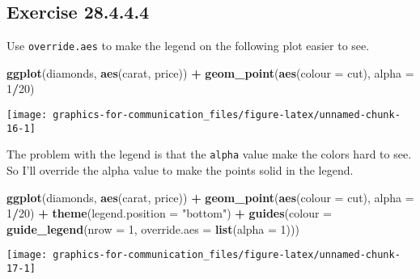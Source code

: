 \documentclass[]{book}
\newenvironment{Shaded}{\begin{snugshade}}{\end{snugshade}}
\newcommand{\DataTypeTok}[1]{\textcolor[rgb]{0.13,0.29,0.53}{#1}}
\newcommand{\DecValTok}[1]{\textcolor[rgb]{0.00,0.00,0.81}{#1}}
\newcommand{\KeywordTok}[1]{\textcolor[rgb]{0.13,0.29,0.53}{\textbf{#1}}}
\newcommand{\NormalTok}[1]{#1}
\newcommand{\OperatorTok}[1]{\textcolor[rgb]{0.81,0.36,0.00}{\textbf{#1}}}
\newcommand{\StringTok}[1]{\textcolor[rgb]{0.31,0.60,0.02}{#1}}
\theoremstyle{plain}
\theoremstyle{remark}
\begin{document}
\hypertarget{exercise-28.4.4.4}{%
\subsection*{\texorpdfstring{Exercise
{28.4.4.4}}{Exercise 28.4.4.4}}\label{exercise-28.4.4.4}}

Use \texttt{override.aes} to make the legend on the following plot
easier to see.

\begin{Shaded}
\begin{Highlighting}[]
\KeywordTok{ggplot}\NormalTok{(diamonds, }\KeywordTok{aes}\NormalTok{(carat, price)) }\OperatorTok{+}
\StringTok{  }\KeywordTok{geom_point}\NormalTok{(}\KeywordTok{aes}\NormalTok{(}\DataTypeTok{colour =}\NormalTok{ cut), }\DataTypeTok{alpha =} \DecValTok{1}\OperatorTok{/}\DecValTok{20}\NormalTok{)}
\end{Highlighting}
\end{Shaded}

\begin{center}\texttt{[image: graphics-for-communication\_files/figure-latex/unnamed-chunk-16-1]} \end{center}

The problem with the legend is that the \texttt{alpha} value make the
colors hard to see. So I'll override the alpha value to make the points
solid in the legend.

\begin{Shaded}
\begin{Highlighting}[]
\KeywordTok{ggplot}\NormalTok{(diamonds, }\KeywordTok{aes}\NormalTok{(carat, price)) }\OperatorTok{+}
\StringTok{  }\KeywordTok{geom_point}\NormalTok{(}\KeywordTok{aes}\NormalTok{(}\DataTypeTok{colour =}\NormalTok{ cut), }\DataTypeTok{alpha =} \DecValTok{1}\OperatorTok{/}\DecValTok{20}\NormalTok{)  }\OperatorTok{+}
\StringTok{  }\KeywordTok{theme}\NormalTok{(}\DataTypeTok{legend.position =} \StringTok{"bottom"}\NormalTok{) }\OperatorTok{+}
\StringTok{  }\KeywordTok{guides}\NormalTok{(}\DataTypeTok{colour =} \KeywordTok{guide_legend}\NormalTok{(}\DataTypeTok{nrow =} \DecValTok{1}\NormalTok{, }\DataTypeTok{override.aes =} \KeywordTok{list}\NormalTok{(}\DataTypeTok{alpha =} \DecValTok{1}\NormalTok{)))  }
\end{Highlighting}
\end{Shaded}

\begin{center}\texttt{[image: graphics-for-communication\_files/figure-latex/unnamed-chunk-17-1]} \end{center}
\end{document}
